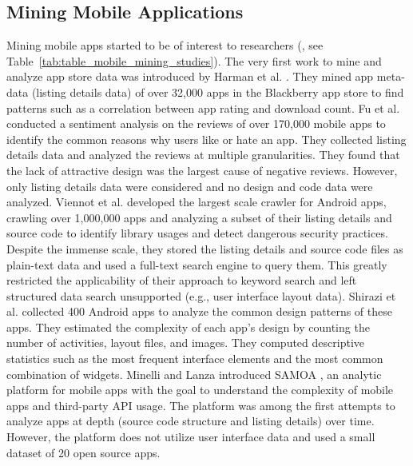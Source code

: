 \subsection{Mining Mobile Applications}
Mining mobile apps started to be of interest to researchers (\cite{Enck_2010_OSDI,Enck_2011_USENIX,zhou_2012_SP_dissecting,Yin_2013_WSDM,Minelli_2013_CMSREuro,Pandita_2013_USENIX,gorla_2014_ICSE,chen_2014_ICSE,Liu_2014_ICSE,Lin_2014_SOUPS,rasthofer_2014_NDSS,Liu_2015_MobiSys,seneviratne_2015_SIGMobile,Yang_2015_ICSE,Baeza-Yates_2015_WSDM,Chen_2015_WSDM,Liu_2015_WSDM}, see Table~\ref{tab:table_mobile_mining_studies}).
The very first work to mine and analyze app store data was introduced by Harman et al. \cite{Harman_2012_MSR}.
They mined app meta-data (listing details data) of over 32,000 apps in the Blackberry app store to find patterns such as a correlation between app rating and download count.
Fu et al. \cite{fu_2013_KDD} conducted a sentiment analysis on the reviews of over 170,000 mobile apps to identify the common reasons why users like or hate an app. 
They collected listing details data and analyzed the reviews at multiple granularities.
They found that the lack of attractive design was the largest cause of negative reviews. 
However, only listing details data were considered and no design and code data were analyzed.
Viennot et al. \cite{viennot_2014_metrics} developed the largest scale crawler for Android apps, crawling over 1,000,000 apps and analyzing a subset of their listing details and source code to identify library usages and detect dangerous security practices.
Despite the immense scale, they stored the listing details and source code files as plain-text data and used a full-text search engine to query them.
This greatly restricted the applicability of their approach to keyword search and left structured data search unsupported (e.g., user interface layout data).
Shirazi et al. \cite{shirazi_EICS_2013} collected 400 Android apps to analyze the common design patterns of these apps.
They estimated the complexity of each app's design by counting the number of activities, layout files, and images.
They computed descriptive statistics such as the most frequent interface elements and the most common combination of widgets.
Minelli and Lanza introduced SAMOA \cite{Minelli_2013_CMSREuro}, an analytic platform for mobile apps with the goal to understand the complexity of mobile apps and third-party API usage.
The platform was among the first attempts to analyze apps at depth (source code structure and listing details) over time.
However, the platform does not utilize user interface data and used a small dataset of 20 open source apps.

